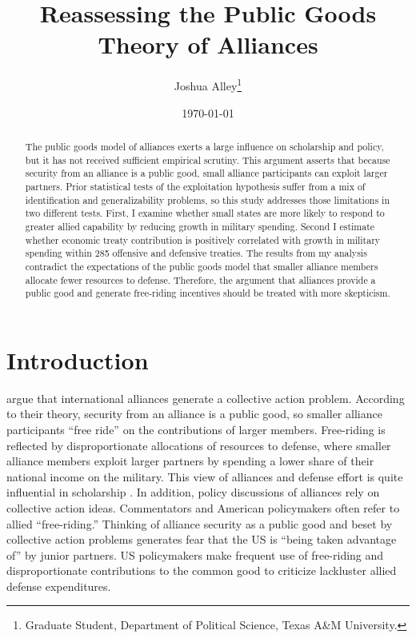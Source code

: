 \documentclass[12pt]{article}
\title{
\textbf{Reassessing the Public Goods Theory of Alliances}
	}
\author{Joshua Alley\footnote{Graduate Student,
Department of Political Science, Texas A\&M University.}}
\date{{\normalsize \today}}
\begin{document}
\maketitle 

\doublespace

\begin{abstract}
The public goods model of alliances exerts a large influence on scholarship and policy, but it has not received sufficient empirical scrutiny. 
This argument asserts that because security from an alliance is a public good, small alliance participants can exploit larger partners. 
Prior statistical tests of the exploitation hypothesis suffer from a mix of identification and generalizability problems, so this study addresses those limitations in two different tests. 
First, I examine whether small states are more likely to respond to greater allied capability by reducing growth in military spending. 
Second I estimate whether economic treaty contribution is positively correlated with growth in military spending within 285 offensive and defensive treaties. 
The results from my analysis contradict the expectations of the public goods model that smaller alliance members allocate fewer resources to defense. 
Therefore, the argument that alliances provide a public good and generate free-riding incentives should be treated with more skepticism. 

\end{abstract} 



\section{Introduction}



\citet{OlsonZeckhauser1966} argue that international alliances generate a collective action problem. 
According to their theory, security from an alliance is a public good, so smaller alliance participants ``free ride'' on the contributions of larger members. 
Free-riding is reflected by disproportionate allocations of resources to defense, where smaller alliance members exploit larger partners by spending a lower share of their national income on the military.
This view of alliances and defense effort is quite influential in scholarship \citep{Walt1990, Mearsheimer1994, SandlerHartley2001, Garfinkel2004, Walt2009, Barrett2010}. 
In addition, policy discussions of alliances rely on collective action ideas.
Commentators and American policymakers often refer to allied ``free-riding.'' 
Thinking of alliance security as a public good and beset by collective action problems generates fear that the US is ``being taken advantage of'' by junior partners. 
US policymakers make frequent use of free-riding and disproportionate contributions to the common good to criticize lackluster allied defense expenditures.  
\end{document}
